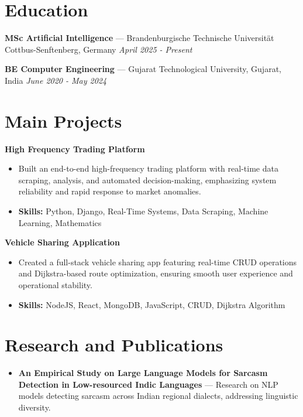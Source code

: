 \documentclass[a4paper,10pt]{article}
\begin{document}
\section*{Education}
\textbf{MSc Artificial Intelligence} — Brandenburgische Technische Universität Cottbus-Senftenberg, Germany \hfill \textit{April 2025 - Present}\par
\vspace{1.5pt}
\textbf{BE Computer Engineering} — Gujarat Technological University, Gujarat, India \hfill \textit{June 2020 - May 2024}\par

\section*{Main Projects}
\textbf{High Frequency Trading Platform}\par
\vspace{1pt}
\begin{itemize}
  \item Built an end-to-end high-frequency trading platform with real-time data scraping, analysis, and automated decision-making, emphasizing system reliability and rapid response to market anomalies.
  \item \textbf{Skills:} Python, Django, Real-Time Systems, Data Scraping, Machine Learning, Mathematics
\end{itemize}
\vspace{3pt}
\textbf{Vehicle Sharing Application}\par
\vspace{1pt}
\begin{itemize}
  \item Created a full-stack vehicle sharing app featuring real-time CRUD operations and Dijkstra-based route optimization, ensuring smooth user experience and operational stability.
  \item \textbf{Skills:} NodeJS, React, MongoDB, JavaScript, CRUD, Dijkstra Algorithm
\end{itemize}

\section*{Research and Publications}
\begin{itemize}
\item \textbf{An Empirical Study on Large Language Models for Sarcasm Detection in Low-resourced Indic Languages} — Research on NLP models detecting sarcasm across Indian regional dialects, addressing linguistic diversity.
\end{itemize}
\end{document}
